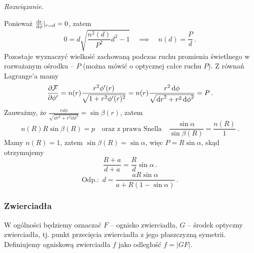 \documentclass[../main.tex]{subfiles}
\begin{document}
\begin{enumerate}
\textit{Rozwiązanie.}
\medskip

Ponieważ \(\dv{r}{\phi}|_{r=d}=0\), zatem 
\begin{equation*}
    0=d\sqrt{\frac{n^2(d)}{P^2}d^2-1}\quad \implies \quad n(d)=\frac{P}{d}\,.
\end{equation*}
Pozostaje wyznaczyć wielkość zachowaną podczas ruchu promienia świetlnego w rozważanym ośrodku -- \(P\) (można mówić o optycznej całce ruchu \(P\)). Z równań Lagrange'a mamy
\begin{equation*}
    \pdv{\mathcal{F}}{\phi'}=n(r)\frac{r^2\phi'(r)}{\sqrt{1+r^2\phi'(r)^2}}=n(r)\frac{r^2\dd{\phi}}{\sqrt{\dd{r}^2+r^2\dd{\phi}^2}}=P\,.
\end{equation*}
Zauważmy, że \(\frac{r\dd{\phi}}{\sqrt{\dd{r}^2+r^2\dd{\phi}^2}}=\sin \beta(r)\), zatem
\begin{equation*}
    n(R)R\sin\beta(R)=p\quad \text{oraz z prawa Snella}\quad \frac{\sin \alpha }{\sin \beta(R)}=\frac{n(R)}{1}\,.
\end{equation*}
Mamy \(n(R)=1\), zatem \(\sin\beta(R)=\sin\alpha\), więc \(P=R\sin\alpha\), skąd otrzymujemy
\begin{equation*}
    \frac{R+a}{d+a}=\frac{R}{d}\sin\alpha\,.
\end{equation*}
\begin{equation*}
    \text{Odp.: }\,d=\frac{aR\sin\alpha}{a+R(1-\sin\alpha)}\,.
\end{equation*}
\end{enumerate}
\subsubsection{Zwierciadła}
W ogólności będziemy oznaczać \(F\) -- ognisko zwierciadła, \(G\) -- środek optyczny zwierciadła, tj. punkt przecięcia zwierciadła z jego płaszczyzną symetrii. Definiujemy ogniskową zwierciadła \(f\) jako odległość \(f=|GF|\).
\medskip
\end{document}
